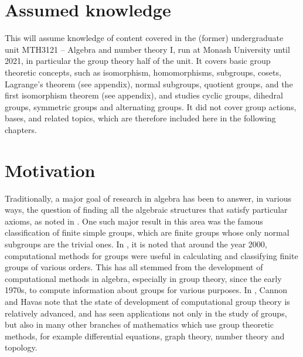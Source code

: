 \section{Assumed knowledge}

This \thesis{} will assume knowledge of content covered in the (former) undergraduate unit MTH3121 -- Algebra and number theory I, run at Monash University until 2021, in particular the group theory half of the unit. It covers basic group theoretic concepts, such as isomorphism, homomorphisms, subgroups, cosets, Lagrange's theorem (see appendix), normal subgroups, quotient groups, and the first isomorphism theorem (see appendix), and studies cyclic groups, dihedral groups, symmetric groups and alternating groups. It did not cover group actions, bases, and related topics, which are therefore included here in the following chapters.

\section{Motivation}

Traditionally, a major goal of research in algebra has been to answer, in various ways, the question of finding all the algebraic structures that satisfy particular axioms, as noted in \cite{cannon_havas1992}. One such major result in this area was the famous classification of finite simple groups, which are finite groups whose only normal subgroups are the trivial ones. In \cite{solomon2001}, it is noted that around the year 2000, computational methods for groups were useful in calculating and classifying finite groups of various orders. This has all stemmed from the development of computational methods in algebra, especially in group theory, since the early 1970s, to compute information about groups for various purposes. In \cite{cannon_havas1992}, Cannon and Havas note that the state of development of computational group theory is relatively advanced, and has seen applications not only in the study of groups, but also in many other branches of mathematics which use group theoretic methods, for example differential equations, graph theory, number theory and topology.

